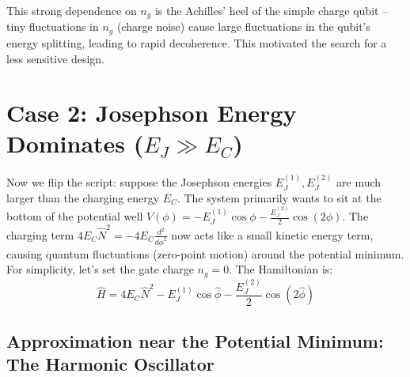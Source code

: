 \documentclass{book}
\begin{document}
This strong dependence on \(n_g\) is the Achilles' heel of the simple charge qubit – tiny fluctuations in \(n_g\) (charge noise) cause large fluctuations in the qubit's energy splitting, leading to rapid decoherence. This motivated the search for a less sensitive design.

\section[Case 2: Josephson Energy Dominates]{Case 2: Josephson Energy Dominates (\(E_J \gg E_C\))}
\label{sec:josephson_regime}

Now we flip the script: suppose the Josephson energies \(E_J^{(1)}, E_J^{(2)}\) are much larger than the charging energy \(E_C\). The system primarily wants to sit at the bottom of the potential well \(V(\phi) = -E_J^{(1)} \cos \phi - \frac{E_J^{(2)}}{2} \cos (2 \phi)\). The charging term \(4 E_C \hat{N}^2 = -4 E_C \frac{d^2}{d\phi^2}\) now acts like a small kinetic energy term, causing quantum fluctuations (zero-point motion) around the potential minimum. For simplicity, let's set the gate charge \(n_g = 0\). The Hamiltonian is:
\begin{equation}
\hat{H} = 4 E_C \hat{N}^2 - E_J^{(1)} \cos \hat{\phi} - \frac{E_J^{(2)}}{2} \cos (2 \hat{\phi})
\end{equation}

\subsection{Approximation near the Potential Minimum: The Harmonic Oscillator}
\label{subsec:ho_approx}
\end{document}
